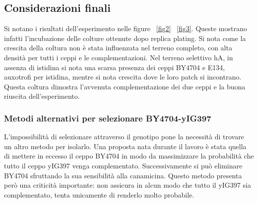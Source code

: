 	\subsection*{Considerazioni finali}
	Si notano i risultati dell'esperimento nelle figure ~\ref{fig2} ~\ref{fig3}.
	Queste mostrano infatti l'incubazione delle colture ottenute dopo replica plating.
	Si nota come la crescita della coltura non \`e stata influenzata nel terreno completo, con alta densit\`a per tutti i ceppi e le complementazioni.
	Nel terreno selettivo hA, in assenza di istidina si nota una scarsa presenza dei ceppi BY4704 e E134, auxotrofi per istidina, mentre si nota crescita dove le loro patch si incontrano.
	Questa coltura dimostra l'avvenuta complementazione dei due ceppi e la buona riuscita dell'esperimento.
	
		\subsubsection*{Metodi alternativi per selezionare BY4704-yIG397}
		L'impossibilit\`a di selezionare attraverso il genotipo pone la necessit\`a di trovare un altro metodo per isolarlo.
		Una proposta nata durante il lavoro \`e stata quella di mettere in eccesso il ceppo BY4704 in modo da massimizzare la probabilit\`a che tutto il ceppo yIG397 venga complementato.
		Successivamente si pu\`o eliminare BY4704 sfruttando la sua sensibilit\`a alla canamicina.
		Questo metodo presenta per\`o una criticit\`a importante: non assicura in alcun modo che tutto il yIG397 sia complementato, tenta unicamente di renderlo molto probabile.
	
